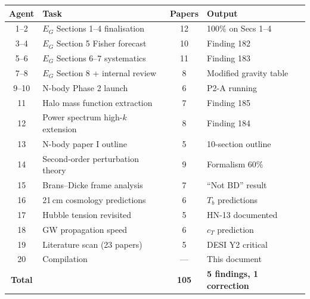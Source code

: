 \documentclass[11pt,a4paper]{article}
\begin{document}
\begin{center}
\begin{tabular}{clcl}
\toprule
\textbf{Agent} & \textbf{Task} & \textbf{Papers} & \textbf{Output} \\
\midrule
1--2 & $E_G$ Sections 1--4 finalisation & 12 & 100\% on Secs 1--4 \\
3--4 & $E_G$ Section 5 Fisher forecast & 10 & Finding 182 \\
5--6 & $E_G$ Sections 6--7 systematics & 11 & Finding 183 \\
7--8 & $E_G$ Section 8 + internal review & 8 & Modified gravity table \\
9--10 & N-body Phase 2 launch & 6 & P2-A running \\
11 & Halo mass function extraction & 7 & Finding 185 \\
12 & Power spectrum high-$k$ extension & 8 & Finding 184 \\
13 & N-body paper I outline & 5 & 10-section outline \\
14 & Second-order perturbation theory & 9 & Formalism 60\% \\
15 & Brans--Dicke frame analysis & 7 & ``Not BD'' result \\
16 & 21\,cm cosmology predictions & 6 & $T_b$ predictions \\
17 & Hubble tension revisited & 5 & HN-13 documented \\
18 & GW propagation speed & 6 & $c_T$ prediction \\
19 & Literature scan (23 papers) & 5 & DESI Y2 critical \\
20 & Compilation & --- & This document \\
\midrule
\textbf{Total} & & \textbf{105} & \textbf{5 findings, 1 correction} \\
\bottomrule
\end{tabular}
\end{center}
\end{document}
